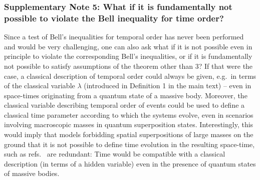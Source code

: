 \documentclass[a4paper,11pt]{article}
\begin{document}
\subsubsection*{Supplementary Note 5: What if it is {fundamentally not possible} to violate the Bell inequality for time order?}

Since a test of Bell's inequalities for temporal order has never been performed and would be very challenging,  one can also ask what if it is not possible even in principle to violate the corresponding Bell's inequalities, or if it is fundamentally not possible to satisfy assumptions of the theorem other than $3$?
If that were the case, a classical description of temporal order could always be given, %
e.g.~in terms of the classical variable $\lambda$ (introduced in Definition 1 in the main text) -- even in space-times originating from a quantum state of a massive body.  Moreover, the classical variable describing temporal order of events could  be used to define a classical time parameter according to which the systems evolve, even in scenarios involving macroscopic masses in quantum superposition states. Interestingly, this would imply that models forbidding spatial superpositions of large masses on the ground that it is not possible to define time evolution in the resulting space-time, such as refs.~\cite{ref:Karolyhazy1966, ref:Diosi1989, ref:Penrose1996, Stamp:2012, Penrose2014}
are redundant: Time would be compatible with a classical description (in terms of a hidden variable) even in the presence of quantum states of massive bodies.
\end{document}
